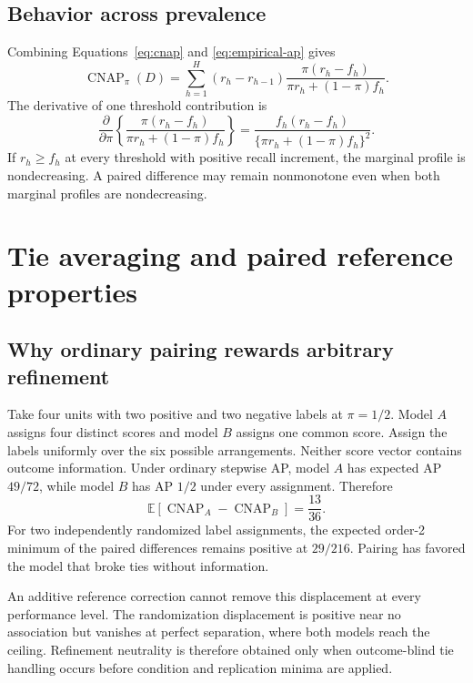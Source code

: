\documentclass[11pt]{article}
\newcommand{\CNAP}{\operatorname{CNAP}}
\newcommand{\E}{\mathbb{E}}
\theoremstyle{remark}
\begin{document}
\subsection{Behavior across prevalence}

Combining Equations~\eqref{eq:cnap} and \eqref{eq:empirical-ap} gives
\begin{equation}
\CNAP_\pi(D)
=
\sum_{h=1}^H
(r_h-r_{h-1})
\frac{\pi(r_h-f_h)}
{\pi r_h+(1-\pi)f_h}.
\label{eq:cnap-profile}
\end{equation}
The derivative of one threshold contribution is
\begin{equation}
\frac{\partial}{\partial\pi}
\left\{
\frac{\pi(r_h-f_h)}
{\pi r_h+(1-\pi)f_h}
\right\}
=
\frac{f_h(r_h-f_h)}
{\{\pi r_h+(1-\pi)f_h\}^2}.
\label{eq:cnap-derivative}
\end{equation}
If $r_h\geq f_h$ at every threshold with positive recall increment, the
marginal profile is nondecreasing. A paired difference may remain nonmonotone
even when both marginal profiles are nondecreasing.


\section{Tie averaging and paired reference properties}
\label{app:paired-proofs}

\subsection{Why ordinary pairing rewards arbitrary refinement}

Take four units with two positive and two negative labels at $\pi=1/2$.
Model $A$ assigns four distinct scores and model $B$ assigns one common score.
Assign the labels uniformly over the six possible arrangements. Neither score
vector contains outcome information. Under ordinary stepwise AP, model $A$ has
expected AP $49/72$, while model $B$ has AP $1/2$ under every assignment.
Therefore
\[
\E[\CNAP_A-\CNAP_B]=\frac{13}{36}.
\]
For two independently randomized label assignments, the expected order-2
minimum of the paired differences remains positive at $29/216$. Pairing has
favored the model that broke ties without information.

An additive reference correction cannot remove this displacement at every
performance level. The randomization displacement is positive near no
association but vanishes at perfect separation, where both models reach the
ceiling. Refinement neutrality is therefore obtained only when outcome-blind
tie handling occurs before condition and replication minima are applied.
\end{document}

